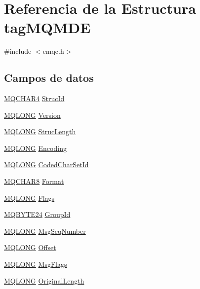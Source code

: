 \hypertarget{structtag_m_q_m_d_e}{}\section{Referencia de la Estructura tag\+M\+Q\+M\+D\+E}
\label{structtag_m_q_m_d_e}


{\ttfamily \#include $<$cmqc.\+h$>$}

\subsection*{Campos de datos}
\begin{DoxyCompactItemize}
\item 
\hyperlink{cmqc_8h_a12590e546ed66fda7cf21c1d5cefa31d}{M\+Q\+C\+H\+A\+R4} \hyperlink{structtag_m_q_m_d_e_a0530922ca944569b52601d74941f96e4}{Struc\+Id}
\item 
\hyperlink{cmqc_8h_a1fb8d28cbda3fa8766a9821230cdb6d5}{M\+Q\+L\+O\+N\+G} \hyperlink{structtag_m_q_m_d_e_a0656ef8f766b3907d394d88a35d7b7e9}{Version}
\item 
\hyperlink{cmqc_8h_a1fb8d28cbda3fa8766a9821230cdb6d5}{M\+Q\+L\+O\+N\+G} \hyperlink{structtag_m_q_m_d_e_a830af9a4a08c015b9a4b2d39d4d3420a}{Struc\+Length}
\item 
\hyperlink{cmqc_8h_a1fb8d28cbda3fa8766a9821230cdb6d5}{M\+Q\+L\+O\+N\+G} \hyperlink{structtag_m_q_m_d_e_a30167bf454a49a60fd3fe4e9e586af34}{Encoding}
\item 
\hyperlink{cmqc_8h_a1fb8d28cbda3fa8766a9821230cdb6d5}{M\+Q\+L\+O\+N\+G} \hyperlink{structtag_m_q_m_d_e_a4d8d1961a991850d1355cdf9b4680b8e}{Coded\+Char\+Set\+Id}
\item 
\hyperlink{cmqc_8h_abddcedb8c41fa262f2bd05dfec3e60a5}{M\+Q\+C\+H\+A\+R8} \hyperlink{structtag_m_q_m_d_e_a435a478822008713f8aaff89f369ed63}{Format}
\item 
\hyperlink{cmqc_8h_a1fb8d28cbda3fa8766a9821230cdb6d5}{M\+Q\+L\+O\+N\+G} \hyperlink{structtag_m_q_m_d_e_a8da770267273b200fa9c968fa2a0da57}{Flags}
\item 
\hyperlink{cmqc_8h_a2866d93c0ef84cfcda34cab5fd22fc5a}{M\+Q\+B\+Y\+T\+E24} \hyperlink{structtag_m_q_m_d_e_abcf7ab1abd1c768c0adb9acb3d09c6f1}{Group\+Id}
\item 
\hyperlink{cmqc_8h_a1fb8d28cbda3fa8766a9821230cdb6d5}{M\+Q\+L\+O\+N\+G} \hyperlink{structtag_m_q_m_d_e_a7c78a4f7c1bbda9f124f904e0d02a7a2}{Msg\+Seq\+Number}
\item 
\hyperlink{cmqc_8h_a1fb8d28cbda3fa8766a9821230cdb6d5}{M\+Q\+L\+O\+N\+G} \hyperlink{structtag_m_q_m_d_e_aac8433c970f16a602e3b79400e87d28b}{Offset}
\item 
\hyperlink{cmqc_8h_a1fb8d28cbda3fa8766a9821230cdb6d5}{M\+Q\+L\+O\+N\+G} \hyperlink{structtag_m_q_m_d_e_a10cb94bb1b2528f6ad936454455bb40a}{Msg\+Flags}
\item 
\hyperlink{cmqc_8h_a1fb8d28cbda3fa8766a9821230cdb6d5}{M\+Q\+L\+O\+N\+G} \hyperlink{structtag_m_q_m_d_e_acf39c0c6d2618f565cf8315c8775b5ae}{Original\+Length}
\end{DoxyCompactItemize}


